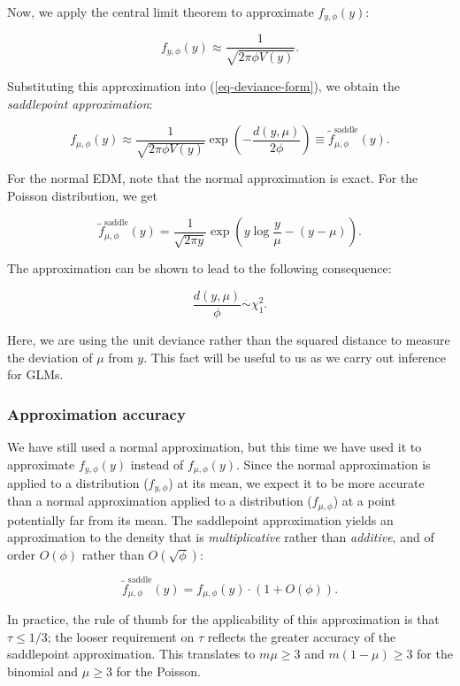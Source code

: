 \documentclass[
  11pt,
  letterpaper,
  oneside]{book}
\theoremstyle{plain}
\theoremstyle{plain}
\theoremstyle{definition}
\theoremstyle{definition}
\theoremstyle{plain}
\theoremstyle{remark}
\begin{document}
Now, we apply the central limit theorem to approximate
\(f_{y, \phi}(y)\):

\[
f_{y, \phi}(y) \approx \frac{1}{\sqrt{2\pi \phi V(y)}}.
\]

Substituting this approximation into (\ref{eq-deviance-form}), we obtain
the \emph{saddlepoint approximation}:

\[
f_{\mu, \phi}(y) \approx \frac{1}{\sqrt{2\pi \phi V(y)}}\exp\left(-\frac{d(y, \mu)}{2\phi}\right) \equiv \widetilde f^{\text{saddle}}_{\mu, \phi}(y).
\]

For the normal EDM, note that the normal approximation is exact. For the
Poisson distribution, we get

\[
\widetilde f^{\text{saddle}}_{\mu, \phi}(y) = \frac{1}{\sqrt{2\pi y}}\exp\left(y \log \frac y \mu - (y - \mu)\right).
\]

The approximation can be shown to lead to the following consequence:

\[
\frac{d(y, \mu)}{\phi} \overset \cdot \sim \chi^2_1.
\]

Here, we are using the unit deviance rather than the squared distance to
measure the deviation of \(\mu\) from \(y\). This fact will be useful to
us as we carry out inference for GLMs.

\hypertarget{approximation-accuracy-1}{%
\subsubsection{Approximation accuracy}\label{approximation-accuracy-1}}

We have still used a normal approximation, but this time we have used it
to approximate \(f_{y, \phi}(y)\) instead of \(f_{\mu, \phi}(y)\). Since
the normal approximation is applied to a distribution (\(f_{y, \phi}\))
at its mean, we expect it to be more accurate than a normal
approximation applied to a distribution (\(f_{\mu, \phi}\)) at a point
potentially far from its mean. The saddlepoint approximation yields an
approximation to the density that is \emph{multiplicative} rather than
\emph{additive}, and of order \(O(\phi)\) rather than
\(O(\sqrt{\phi})\):

\[
\tilde f^{\text{saddle}}_{\mu, \phi}(y) = f_{\mu, \phi}(y) \cdot (1 + O(\phi)).
\]

In practice, the rule of thumb for the applicability of this
approximation is that \(\tau \leq 1/3\); the looser requirement on
\(\tau\) reflects the greater accuracy of the saddlepoint approximation.
This translates to \(m\mu \geq 3\) and \(m(1-\mu) \geq 3\) for the
binomial and \(\mu \geq 3\) for the Poisson.
\end{document}
